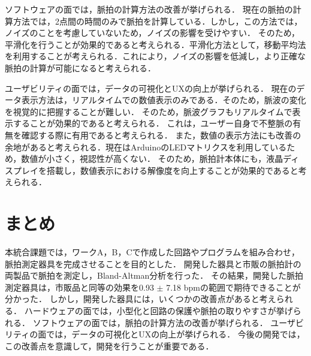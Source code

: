 ソフトウェアの面では，脈拍の計算方法の改善が挙げられる．
現在の脈拍の計算方法では，2点間の時間のみで脈拍を計算している．しかし，この方法では，ノイズのことを考慮していないため，ノイズの影響を受けやすい．
そのため，平滑化を行うことが効果的であると考えられる．平滑化方法として，移動平均法を利用することが考えられる．これにより，ノイズの影響を低減し，より正確な脈拍の計算が可能になると考えられる．

ユーザビリティの面では，データの可視化とUXの向上が挙げられる．
現在のデータ表示方法は，リアルタイムでの数値表示のみである．そのため，脈波の変化を視覚的に把握することが難しい．
そのため，脈波グラフもリアルタイムで表示することが効果的であると考えられる．
これは，ユーザー自身で不整脈の有無を確認する際に有用であると考えられる．
また，数値の表示方法にも改善の余地があると考えられる．現在はArduinoのLEDマトリクスを利用しているため，数値が小さく，視認性が高くない．
そのため，脈拍計本体にも，液晶ディスプレイを搭載し，数値表示における解像度を向上することが効果的であると考えられる．

\section{まとめ}
本統合課題では，ワークA，B，Cで作成した回路やプログラムを組み合わせ，脈拍測定器具を完成させることを目的とした．
開発した器具と市販の脈拍計の両製品で脈拍を測定し，Bland-Altman分析を行った．
その結果，開発した脈拍測定器具は，市販品と同等の効果を0.93 $\pm$ 7.18 bpmの範囲で期待できることが分かった．
しかし，開発した器具には，いくつかの改善点があると考えられる．
ハードウェアの面では，小型化と回路の保護や脈拍の取りやすさが挙げられる．
ソフトウェアの面では，脈拍の計算方法の改善が挙げられる．
ユーザビリティの面では，データの可視化とUXの向上が挙げられる．
今後の開発では，この改善点を意識して，開発を行うことが重要である．